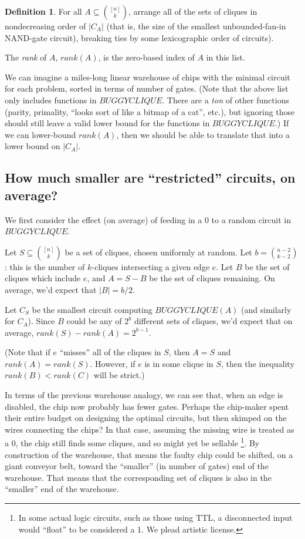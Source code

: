 \documentclass[12pt]{article}
\theoremstyle{definition}
\newtheorem{defn}{Definition}[section]
\begin{document}
\begin{defn}
\label{Rank}
For all $A \subseteq {[n] \choose k}$,
arrange all of the sets of cliques in nondecreasing order
of $|C_A|$ (that is, the size of the smallest
unbounded-fan-in NAND-gate circuit),
breaking ties by some lexicographic order of circuits).

The {\em rank} of $A$, $rank(A)$, is the zero-based
index of $A$ in this list.
\end{defn}

We can imagine a miles-long linear warehouse of chips with the minimal
circuit for each problem, sorted in terms of number of gates.
(Note that the above list only includes functions in $BUGGYCLIQUE$.
There are a {\em ton} of other functions (parity, primality, ``looks
sort of like a bitmap of a cat'', etc.), but ignoring
those should still leave a valid lower bound for the functions in $BUGGYCLIQUE$.)
If we can lower-bound $rank(A)$, then we should be able to translate
that into a
lower bound on $|C_A|$.

\subsection{How much smaller are ``restricted'' circuits, on average?}

We first consider the effect (on average) of feeding in a 0
to a random circuit in $BUGGYCLIQUE$.

Let $S \subseteq {[n] \choose k}$ be a set of cliques,
chosen uniformly at random.
Let $b = {n-2 \choose k-2}$: this is the number of $k$-cliques
intersecting a given edge $e$. Let $B$ be the set of cliques
which include $e$, and $A = S-B$ be the set of cliques remaining.
On average, we'd expect that $|B| = b/2$.

Let $C_S$ be the smallest circuit computing $BUGGYCLIQUE(A)$
(and similarly for $C_A$). Since $B$ could be any of $2^b$ different
sets of cliques, we'd expect that on average,
$rank(S) - rank(A) = 2^{b-1}$.

(Note that if $e$ ``misses'' all of the cliques in $S$, then $A = S$
and $rank(A) = rank(S)$. However, if $e$ is in some clique in $S$,
then the inequality $rank(B) < rank(C)$ will be strict.)

In terms of the previous warehouse analogy, we can see that,
when an edge is disabled, the chip now probably has fewer gates.
Perhaps the chip-maker spent their entire budget on designing the
optimal circuits, but then skimped on the wires connecting the chips?
In that case, assuming the missing wire is treated as a 0, the chip still
finds some cliques, and so might yet be sellable
\footnote{In some actual logic circuits, such as those
using TTL, a disconnected input
would ``float'' to be considered a 1. We plead artistic license.}.
By construction of the warehouse, that means the faulty chip could be shifted,
on a giant conveyor belt,
toward the ``smaller'' (in number of gates) end of the warehouse.
That means that the corresponding set of cliques is also
in the ``smaller'' end of the warehouse.
\end{document}
